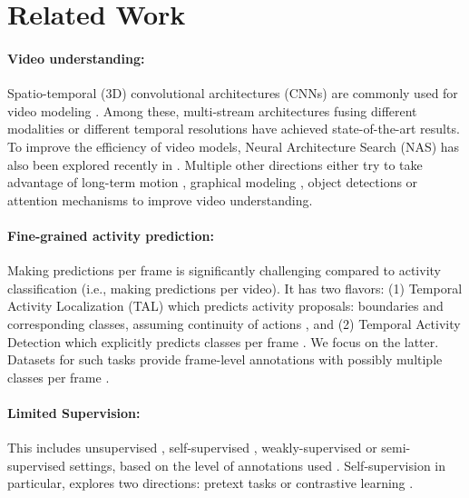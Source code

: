 \documentclass[letterpaper]{article} \usepackage{aaai23}  \usepackage{times}  \usepackage{helvet}  \usepackage{courier}  \usepackage[hyphens]{url}  \usepackage{graphicx} \urlstyle{rm} \def\UrlFont{\rm}  \usepackage{natbib}  \usepackage{caption} \frenchspacing  \setlength{\pdfpagewidth}{8.5in}  \setlength{\pdfpageheight}{11in}  \usepackage{algorithm}
\begin{document}
\section{Related Work}
\label{sec:related}

\paragraph{Video understanding:} Spatio-temporal (3D) convolutional architectures (CNNs) are commonly used for video modeling \cite{tran2014c3d, carreira2017quo, xu2017r}. Among these, multi-stream architectures fusing different modalities \cite{simonyan2014two, feichtenhofer2016convolutional} or different temporal resolutions \cite{feichtenhofer2019slowfast} have achieved state-of-the-art results. To improve the efficiency of video models, Neural Architecture Search (NAS) has also been explored recently in \cite{ryoo2019assemblenet, feichtenhofer2020x3d}. Multiple other directions either try to take advantage of long-term motion \cite{yue2015beyond, varol2017long, piergiovanni2018learning}, graphical modeling \cite{zhao2021video, mavroudi2020representation}, object detections \cite{baradel2018object, zhou2019grounded} or attention mechanisms \cite{nawhal2021activity, chang2021augmented, fan2021multiscale} to improve video understanding.

\paragraph{Fine-grained activity prediction:} Making predictions per frame is significantly challenging compared to activity classification (i.e., making predictions per video). It has two flavors: (1) Temporal Activity Localization (TAL) which predicts activity proposals: boundaries and corresponding classes, assuming continuity of actions \cite{shou2016temporal, escorcia2016daps, buch2017sst, yeung2016end, shou2017cdc, zhai2021action, tirupattur2021modeling, liu2021acsnet, guo2022uncertainty}, and (2) Temporal Activity Detection which explicitly predicts classes per frame \cite{piergiovanni2019temporal, kahatapitiya2021coarse, dai2021pdan}. We focus on the latter. Datasets for such tasks provide frame-level annotations with possibly multiple classes per frame \cite{caba2015activitynet, sigurdsson2016hollywood, yeung2018every}.


\paragraph{Limited Supervision:} This includes unsupervised \cite{sener2018unsupervised,kukleva2019unsupervised,gong2020learning}, self-supervised \cite{jain2020actionbytes,chen2020action}, weakly-supervised \cite{sun2015temporal} or semi-supervised \cite{ji2019learning} settings, based on the level of annotations used \cite{chen2022semi}. Self-supervision in particular, explores two directions: pretext tasks \cite{misra2016shuffle, wei2018learning, purushwalkam2020aligning, zhukov2020learning, recasens2021broaden} or contrastive learning \cite{he2020momentum, chen2020simple, chen2021exploring}.
\end{document}
